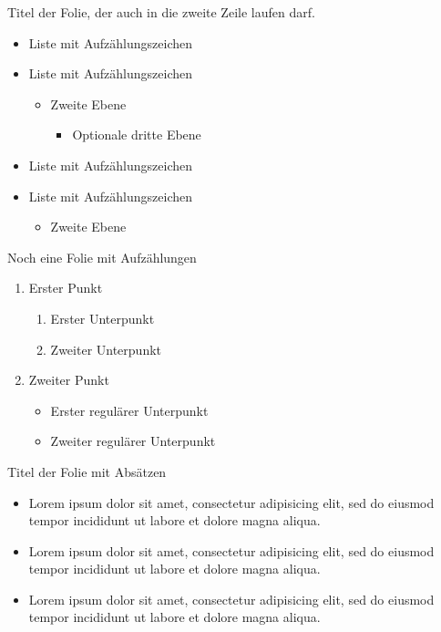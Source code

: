\begin{frame}{Titel der Folie, der auch in die zweite Zeile laufen darf.}
  \begin{itemize}
    \item Liste mit Aufzählungszeichen
    \item Liste mit Aufzählungszeichen
      \begin{itemize}
        \item Zweite Ebene
          \begin{itemize}
            \item Optionale dritte Ebene
          \end{itemize}
      \end{itemize}
    \item Liste mit Aufzählungszeichen
    \item Liste mit Aufzählungszeichen
      \begin{itemize}
        \item Zweite Ebene
      \end{itemize}
  \end{itemize}
\end{frame}

\begin{frame}{Noch eine Folie mit Aufzählungen}
  \begin{enumerate}
    \item Erster Punkt
      \begin{enumerate}
        \item Erster Unterpunkt
        \item Zweiter Unterpunkt
      \end{enumerate}
    \item Zweiter Punkt
      \begin{itemize}
        \item Erster regulärer Unterpunkt
        \item Zweiter regulärer Unterpunkt
      \end{itemize}
  \end{enumerate}
\end{frame}

\begin{frame}{Titel der Folie mit Absätzen}
  \begin{itemize}
    \item Lorem ipsum dolor sit amet, consectetur adipisicing elit, sed do eiusmod tempor incididunt ut labore et dolore magna aliqua.
    \item Lorem ipsum dolor sit amet, consectetur adipisicing elit, sed do eiusmod tempor incididunt ut labore et dolore magna aliqua.
    \item Lorem ipsum dolor sit amet, consectetur adipisicing elit, sed do eiusmod tempor incididunt ut labore et dolore magna aliqua.
  \end{itemize}
\end{frame}

